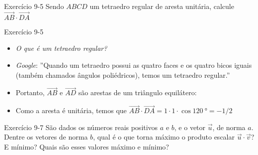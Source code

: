 \begin{frame}[c]{Exercício 9-5}
    Sendo \(ABCD\) um tetraedro regular de aresta unitária, calcule \(\vec{AB}\cdot\vec{DA}\)
\end{frame}

\begin{frame}{Exercício 9-5}
    \begin{itemize}
        \item \textit{O que é um tetraedro regular?}
        \item \textit{Google}:
            ''Quando um tetraedro possui as quatro faces e os quatro
            bicos iguais (também chamados ângulos poliédricos), temos um
            tetraedro regular.''
        \item Portanto, \(\vec{AB}\) e \(\vec{AD}\) são arestas de um triângulo equilátero:
        \item Como a aresta é unitária, temos que
            \(\vec{AB}\cdot\vec{DA}=1 \cdot 1 \cdot \cos{\SI{120}{\degree}}=-1/2\)
    \end{itemize}
\end{frame}

\begin{frame}[c]{Exercício 9-7}
    São dados os números reais positivos \(a\) e \(b\), e o vetor \(\vec{u}\), de norma \(a\).
    Dentre os vetores de norma \(b\), qual é o que torna máximo o produto escalar \(\vec{u}\cdot\vec{v}\)?
    E mínimo? Quais são esses valores máximo e mínimo?
\end{frame}

